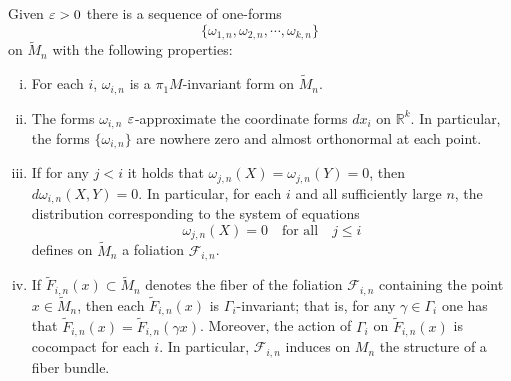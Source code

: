 \documentclass{amsart}
\begin{document}
\begin{lem}
Given $\varepsilon>0$ there is a sequence of one-forms
$$\{\omega_{1,n},\omega_{2,n},\cdots,\omega_{k,n}\}$$
on $\tilde M_n$
with the following properties:
\begin{enumerate}[(i)]
\item For each $i$, $\omega_{i,n}$ is a $\pi_1M$-invariant form on $\tilde M_n$.
\item The forms $\omega_{i,n}$ $\varepsilon$-approximate
the coordinate forms $dx_i$ on $\mathbb{R}^k$.
In particular, the forms $\{\omega_{i,n}\}$ are nowhere zero
and almost orthonormal at each point.
\item
If for any $j<i$ it holds that
$\omega_{j,n}(X)=\omega_{j,n}(Y)=0$, then $d\omega_{i,n}(X,Y)=0$.
In particular,
for each $i$ and all sufficiently large $n$,
the distribution corresponding to the system of equations
$$\omega_{j,n}(X)=0 \quad\text{for all}\quad j\le i$$
defines  on $\tilde M_n$ a foliation $\mathcal F_{i,n}$.

\item
If $\tilde F_{i,n}(x)\subset \tilde M_n$ denotes
the fiber of the foliation $\mathcal F_{i,n}$ containing the point $x\in \tilde M_n$,
then each $\tilde F_{i,n}(x)$ is $\Gamma_i$-invariant;
that is,  for any $\gamma\in \Gamma_i$
one has that $\tilde F_{i,n}(x)=\tilde F_{i,n}(\gamma x)$.
 Moreover, the action of $\Gamma_i$ on $\tilde F_{i,n}(x)$ is cocompact
for each $i$. In particular, $\mathcal F_{i,n}$ induces on $M_n$
the structure of a fiber bundle.
\end{enumerate}
\end{lem}
\end{document}
